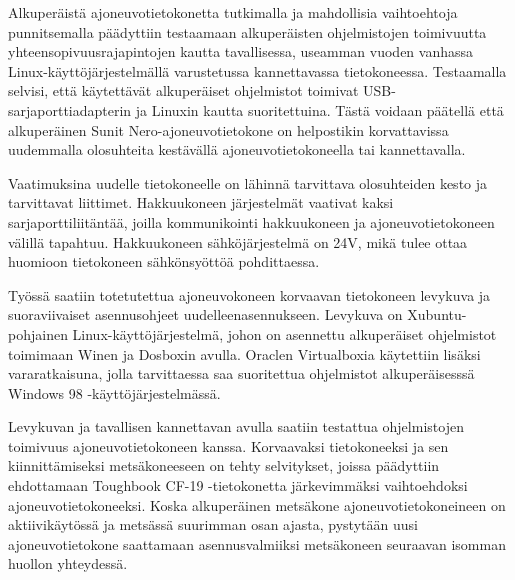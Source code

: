 Alkuperäistä ajoneuvotietokonetta tutkimalla ja mahdollisia vaihtoehtoja punnitsemalla päädyttiin testaamaan alkuperäisten ohjelmistojen toimivuutta yhteensopivuusrajapintojen kautta tavallisessa, useamman vuoden vanhassa Linux-käyttöjärjestelmällä varustetussa kannettavassa tietokoneessa. Testaamalla selvisi, että käytettävät alkuperäiset ohjelmistot toimivat USB-sarjaporttiadapterin ja Linuxin kautta suoritettuina. Tästä voidaan päätellä että alkuperäinen Sunit Nero-ajoneuvotietokone on helpostikin korvattavissa uudemmalla olosuhteita kestävällä ajoneuvotietokoneella tai kannettavalla.

Vaatimuksina uudelle tietokoneelle on lähinnä tarvittava olosuhteiden kesto ja tarvittavat liittimet. Hakkuukoneen järjestelmät vaativat kaksi sarjaporttiliitäntää, joilla kommunikointi hakkuukoneen ja ajoneuvotietokoneen välillä tapahtuu. Hakkuukoneen sähköjärjestelmä on 24V, mikä tulee ottaa huomioon tietokoneen sähkönsyöttöä pohdittaessa.

Työssä saatiin totetutettua ajoneuvokoneen korvaavan tietokoneen levykuva ja suoraviivaiset asennusohjeet uudelleenasennukseen. Levykuva on Xubuntu-pohjainen Linux-käyttöjärjestelmä, johon on asennettu alkuperäiset ohjelmistot toimimaan Winen ja Dosboxin avulla. Oraclen Virtualboxia käytettiin lisäksi vararatkaisuna, jolla tarvittaessa saa suoritettua ohjelmistot alkuperäisesssä Windows 98 -käyttöjärjestelmässä.

Levykuvan ja tavallisen kannettavan avulla saatiin testattua ohjelmistojen toimivuus ajoneuvotietokoneen kanssa. Korvaavaksi tietokoneeksi ja sen kiinnittämiseksi metsäkoneeseen on tehty selvitykset, joissa päädyttiin ehdottamaan Toughbook CF-19 -tietokonetta järkevimmäksi vaihtoehdoksi ajoneuvotietokoneeksi. Koska alkuperäinen metsäkone ajoneuvotietokoneineen on aktiivikäytössä ja metsässä suurimman osan ajasta, pystytään uusi ajoneuvotietokone saattamaan asennusvalmiiksi metsäkoneen seuraavan isomman huollon yhteydessä.








